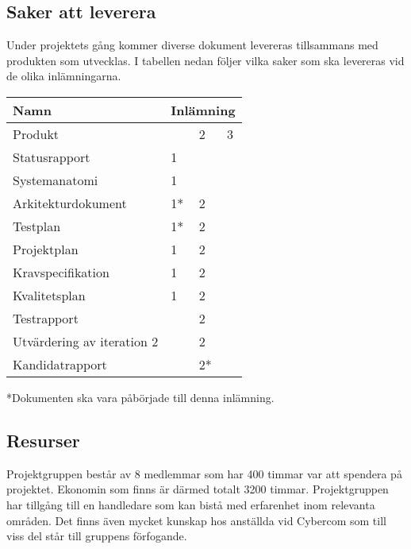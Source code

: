 \subsection{Saker att leverera}
Under projektets gång kommer diverse dokument levereras tillsammans med produkten som utvecklas. I tabellen nedan följer vilka saker som ska levereras vid de olika inlämningarna.

\begin{center}
    \begin{tabular}{| l | l | l | l |}
        \hline
        \textbf{Namn} & \multicolumn{3}{|c|}{ \textbf{Inlämning} } \\
        \hline
        \centering Produkt & & 2 & 3 \\
        \hline
        \centering Statusrapport & 1 & &\\
        \hline
        \centering Systemanatomi & 1 & &\\
        \hline
        \centering Arkitekturdokument & 1* & 2 &\\
        \hline
        \centering Testplan & 1* & 2 &\\
        \hline
        \centering Projektplan & 1 & 2 &\\
        \hline
        \centering Kravspecifikation & 1 & 2 &\\
        \hline
        \centering Kvalitetsplan & 1 & 2 &\\
        \hline
        \centering Testrapport & & 2 & \\
        \hline
        \centering Utvärdering av iteration 2 & & 2 &\\
        \hline
        \centering Kandidatrapport & & 2* &\\
        \hline
    \end{tabular}
\end{center}

*Dokumenten ska vara påbörjade till denna inlämning.

\subsection{Resurser}
Projektgruppen består av 8 medlemmar som har 400 timmar var att spendera på projektet. Ekonomin som finns är därmed totalt 3200 timmar. Projektgruppen har tillgång till en handledare som kan bistå med erfarenhet inom relevanta områden. Det finns även mycket kunskap hos anställda vid Cybercom som till viss del står till gruppens förfogande.\\

